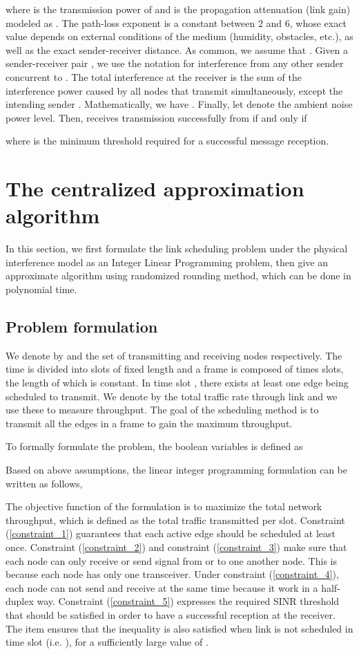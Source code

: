 \documentclass[conference]{IEEEtran}
\begin{document}
where  is the transmission power of  and
 is the propagation attenuation (link gain) modeled
as . The path-loss
exponent  is a constant between 2 and 6, whose exact value
depends on external conditions of the medium (humidity, obstacles,
etc.), as well as the exact sender-receiver distance. As common, we
assume that  \cite{gupta2000cwn}. Given a
sender-receiver pair , we use the notation  for interference from any other sender  concurrent to
. The total interference  at the receiver  is the sum
of the interference power caused by all nodes that transmit
simultaneously, except the intending sender . Mathematically,
we have .
Finally, let  denote the ambient noise power level. Then, 
receives transmission successfully from  if and only if

where  is the minimum  threshold required for a
successful message reception.

\section{The centralized approximation algorithm}\label{section4}

In this section, we first formulate the link scheduling problem
under the physical interference model as an Integer Linear
Programming problem, then give an approximate algorithm using
randomized rounding method, which can be done in polynomial time.
\subsection{Problem formulation}
We denote by  and  the set of
transmitting and receiving nodes respectively. The time is divided
into slots of fixed length and a frame is composed of  times
slots, the length of which is constant. In time slot ,
there exists at least one edge being scheduled to transmit. We
denote by  the total traffic rate through
link  and we use these to measure throughput. The goal of the
scheduling method is to transmit all the edges in a frame to gain
the maximum throughput.

To formally formulate the problem, the boolean variables 
is defined as


Based on above assumptions, the linear integer programming
formulation can be written as follows,







The objective function of the formulation is to maximize the total
network throughput, which is defined as the total traffic
transmitted per slot. Constraint (\ref{constraint_1}) guarantees
that each active edge should be scheduled at least once. Constraint
(\ref{constraint_2}) and constraint (\ref{constraint_3}) make sure
that each node can only receive or send signal from or to one
another node. This is because each node has only one transceiver.
Under constraint (\ref{constraint_4}), each node can not send and
receive at the same time because it work in a half-duplex way.
Constraint (\ref{constraint_5}) expresses the required SINR
threshold that should be satisfied in order to have a successful
reception at the receiver. The item  ensures
that the inequality is also satisfied when link  is not
scheduled in time slot  (i.e. ), for a sufficiently
large value of .
\end{document}
